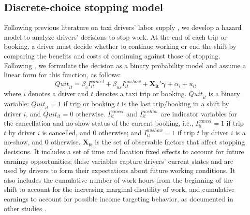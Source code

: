 \documentclass[reviewmode]{restud}
\begin{document}
\subsection{Discrete-choice stopping model}
Following previous literature on taxi drivers' labor supply \citep{farber2005tomorrow,farber2015you,agarwal2015singaporean,chen2015dynamic}, we develop a hazard model to analyze drivers' decisions to stop work. At the end of each trip or booking, a driver must decide whether to continue working or end the shift by comparing the benefits and costs of continuing against those of stopping. 
Following \citet{farber2005tomorrow,farber2015you}, we  
formulate the decision as a  binary probability model 
and assume a linear form for this function, as follows:
\begin{equation}
\label{eq:quit}
{Quit}_{it} = \beta_{c}I^{cancel}_{it} + \beta_{ns} I^{noshow}_{it} + \mathbf{X_{it}}'\mathbf{\gamma} + \alpha_i  + u_{it}
\end{equation}
where $i$ denotes a driver and $t$ denotes a taxi trip or booking. ${Quit}_{it}$ is a binary variable: ${Quit}_{it} = 1$ if trip or booking $t$ is the last trip/booking in a shift by driver $i$, and $Quit_{it} = 0$ otherwise. $I^{cancel}_{it}$ and $I^{noshow}_{it}$ are indicator variables for the cancellation and no-show status of the current booking, i.e., $I^{cancel}_{it}=1$ if trip $t$ by driver $i$ is cancelled, and $0$ otherwise; and $I^{noshow}_{it}=1$ if trip $t$ by driver $i$ is a no-show, and $0$ otherwise. $\mathbf{X_{it}}$ is the set of observable factors that affect stopping decisions.  It includes a set of time and location fixed effects to account for future earnings opportunities; these variables capture drivers' current states and are used by drivers to form their expectations about future working conditions. It also includes the cumulative number of work hours from the beginning of the shift to account for the increasing marginal disutility of work, and cumulative earnings to account for possible income targeting behavior, as documented in other studies \citep{camerer1997labor,crawford2011new}.
\end{document}
